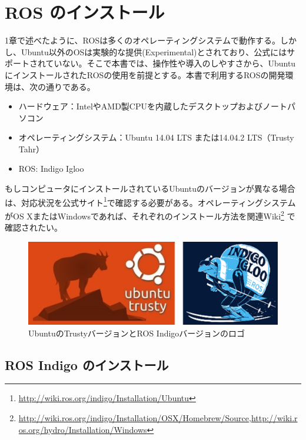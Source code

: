 
\chapter{ROS のインストール}

1章で述べたように、ROSは多くのオペレーティングシステムで動作する。しかし、Ubuntu以外のOSは実験的な提供(Experimental)とされており、公式にはサポートされていない。そこで本書では、操作性や導入のしやすさから、UbuntuにインストールされたROSの使用を前提とする。本書で利用するROSの開発環境は、次の通りである。

\begin{itemize}
\item ハードウェア：IntelやAMD製CPUを内蔵したデスクトップおよびノートパソコン
\item オペレーティングシステム：Ubuntu 14.04 LTS または14.04.2 LTS（Trusty Tahr）
\item ROS: Indigo Igloo
\end{itemize}

もしコンピュータにインストールされているUbuntuのバージョンが異なる場合は、対応状況を公式サイト\footnote{\url{http://wiki.ros.org/indigo/Installation/Ubuntu}}で確認する必要がある。オペレーティングシステムがOS XまたはWindowsであれば、それぞれのインストール方法を関連Wiki\footnote{\url{http://wiki.ros.org/indigo/Installation/OSX/Homebrew/Source},\url{http://wiki.ros.org/hydro/Installation/Windows}} で確認されたい。

\begin{figure}[h]
  \centering
  \includegraphics[width=0.9\columnwidth]{pictures/chapter2/pic_02_01.png}
  \caption{UbuntuのTrustyバージョンとROS Indigoバージョンのロゴ}
\end{figure}

\section{ROS Indigo のインストール}

